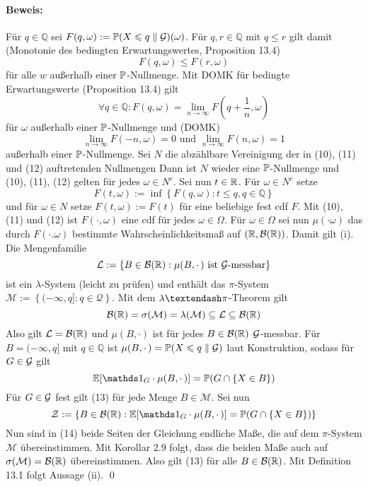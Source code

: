 \documentclass[11pt]{report}
\begin{document}
    \paragraph{Beweis:}Für $q\in\mathbb{Q}$ sei $F(q,\omega):=\mathbb{P}(X\leqslant q\parallel\mathcal{G})(\omega)$. Für $q,r\in\mathbb{Q}$ mit $q\leq r$ gilt damit (Monotonie des bedingten Erwartungswertes, Proposition 13.4)
    \begin{equation}
        F(q,\omega)\leq F(r,\omega)
    \end{equation}
    für alle $w$ außerhalb einer $\mathbb{P}$-Nullmenge. Mit DOMK für bedingte Erwartungswerte (Proposition 13.4) gilt
    \begin{equation}
        \forall q\in\mathbb{Q}:F(q,\omega)=\lim_{n\to\infty}F\left(q+\frac{1}{n},\omega\right)
    \end{equation}
    für $\omega$ außerhalb einer $\mathbb{P}$-Nullmenge und (DOMK)
    \begin{equation}
        \lim_{n\to\infty}F(-n,\omega)=0\text{ und }\lim_{n\to\infty}F(n,\omega)=1
    \end{equation}
    außerhalb einer $\mathbb{P}$-Nullmenge. Sei $N$ die abzählbare Vereinigung der in (10), (11) und (12) auftretenden Nullmengen Dann ist $N$ wieder eine $\mathbb{P}$-Nullmenge und (10), (11), (12) gelten für jedes $\omega\in N^c$.\newline\newline
    Sei nun $t\in\mathbb{R}$. Für $\omega\in N^c$ setze
    $$F(t,\omega):=\inf\left\{F(q,\omega):t\leq q,q\in\mathbb{Q}\right\}$$
    und für $\omega\in N$ setze $F(t,\omega):=F(t)$ für eine beliebige fest cdf $F$. Mit (10), (11) und (12) ist $F(\cdotp,\omega)$ eine cdf für jedes $\omega\in\Omega$. Für $\omega\in\Omega$ sei nun $\mu(\cdotp\omega)$ das durch $F(\cdotp.\omega)$ bestimmte Wahrscheinlichkeitsmaß auf $(\mathbb{R},\mathcal{B}(\mathbb{R}))$. Damit gilt (i). \newline\newline
    Die Mengenfamilie
    $$\mathcal{L}:=\left\{B\in\mathcal{B}(\mathbb{R}):\mu(B,\cdotp)\text{ ist }\mathcal{G}\text{-messbar}\right\}$$
    ist ein $\lambda$-System (leicht zu prüfen) und enthält das $\pi$-System $\mathcal{M}:=\left\{(-\infty,q]:q\in\mathcal{Q}\right\}$. Mit dem $\lambda\textendash\pi$-Theorem gilt
    $$\mathcal{B}(\mathbb{R})=\sigma(\mathcal{M})=\lambda(\mathcal{M})\subseteq\mathcal{L}\subseteq\mathcal{B}(\mathbb{R})$$
    Also gilt $\mathcal{L}=\mathcal{B}(\mathbb{R})$ und $\mu(B,\cdotp)$ ist für jedes $B\in\mathcal{B}(\mathbb{R})$ $\mathcal{G}$-messbar. \newline\newline
    Für $B=(-\infty,q]$ mit $q\in\mathbb{Q}$ ist $\mu(B,\cdotp)=\mathbb{P}(X\leqslant q\parallel\mathcal{G})$ laut Konstruktion, sodass für $G\in\mathcal{G}$ gilt
    \begin{equation}
        \E[\ind{G}\cdot\mu(B,\cdotp)]=\Pp(G\cap\{X\in B\})
    \end{equation}
    Für $G\in\mathcal{G}$ fest gilt (13) für jede Menge $B\in\mathcal{M}$. Sei nun 
    $$\mathcal{Z}:=\left\{B\in\borel:\E[\ind{G}\cdot\mu(B,\cdotp)]=\Pp(G\cap\{X\in B\})\right\}$$
    Nun sind in (14) beide Seiten der Gleichung endliche Maße, die auf dem $\pi$-System $\mathcal{M}$ übereinstimmen. Mit Korollar 2.9 folgt, dass die beiden Maße auch auf $\sigma(\mathcal{M})=\mathcal{B}(\mathbb{R})$ übereinstimmen. Also gilt (13) für alle $B\in\mathcal{B}(\mathbb{R})$. Mit Definition 13.1 folgt Aussage (ii). \qed
\end{document}
